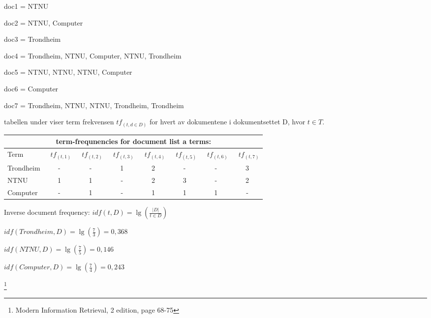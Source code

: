 \documentclass[]{article}
\begin{document}
doc1 = NTNU

doc2 = NTNU, Computer

doc3 = Trondheim

doc4 = Trondheim, NTNU, Computer, NTNU, Trondheim

doc5 = NTNU, NTNU, NTNU, Computer

doc6 = Computer

doc7 = Trondheim, NTNU, NTNU, Trondheim, Trondheim 
\vspace{5 mm}

tabellen under viser term frekvensen $tf_{(t,d \in D)}$ for hvert av dokumentene i dokumentsettet D, hvor $t \in T$.
\vspace{10 mm}

\begin{center}
\begin{tabular}[t]{|l|ccccccc|}

\multicolumn{8}{c}{term-frequnencies for document list a terms:}\\\hline

Term&\ $tf_{(t,1)}$&\ $tf_{(t,2)}$&\ $tf_{(t,3)}$&\ $tf_{(t,4)}$&\ $tf_{(t,5)}$&\ $tf_{(t,6)}$&\ $tf_{(t,7)}$\\\hline

Trondheim&-&-&1&2&-&-&3\\

NTNU&1&1&-&2&3&-&2\\

Computer&-&1&-&1&1&1&-\\\hline
\end{tabular}
\end{center}
\vspace{10 mm}

\begin{center}

Inverse document frequency:
\vspace{5 mm}
$idf(t, D) = \lg(\frac{|D|}{t \in D})$

\vspace{5 mm}

$idf(Trondheim, D) = \lg(\frac{7}{3}) = 0,368$
\vspace{5 mm}

$idf(NTNU, D) = \lg(\frac{7}{5}) = 0,146$
\vspace{5 mm}

$idf(Computer, D) = \lg(\frac{7}{4}) = 0,243$

\end{center}

\let\thefootnote\relax\footnote{Modern Information Retrieval, 2 edition, page 68-75}
\pagebreak
\end{document}

